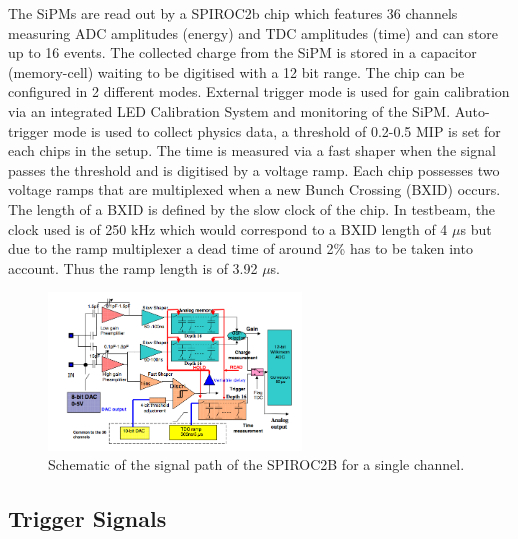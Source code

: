 \documentclass[twoside,a4paper,11pt]{article}
\begin{document}
The SiPMs are read out by a SPIROC2b chip which features 36 channels measuring ADC amplitudes (energy) and TDC amplitudes (time) and can store up to 16 events. The collected charge from the SiPM is stored in a capacitor (memory-cell) waiting to be digitised with a 12 bit range. The chip can be configured in 2 different modes. External trigger mode is used for gain calibration via an integrated LED Calibration System and monitoring of the SiPM. Auto-trigger mode is used to collect physics data, a threshold of 0.2-0.5 MIP is set for each chips in the setup.
The time is measured via a fast shaper when the signal passes the threshold and is digitised by a voltage ramp. Each chip possesses two voltage ramps that are multiplexed when a new Bunch Crossing (BXID) occurs. The length of a BXID is defined by the slow clock of the chip. In testbeam, the clock used is of 250 kHz which would correspond to a BXID length of 4 $\mu$s but due to the ramp multiplexer a dead time of around 2\% has to be taken into account. Thus the ramp length is of 3.92 $\mu$s.\\
\begin{figure}[htbp]
\begin{center}
\includegraphics[width=0.6\textwidth]{fig/Spiroc_layout.png}
\caption{Schematic of the signal path of the SPIROC2B for a single channel.}
\label{fig:SPIROC2B}
\end{center}
\end{figure}
\subsection{Trigger Signals}
\label{subsec:trigger}
\end{document}
